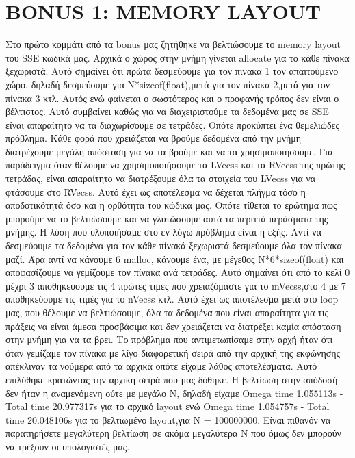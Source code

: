 \documentclass{FR16}
\begin{document}
\newpage

\section{BONUS 1: MEMORY LAYOUT}
Στο πρώτο κομμάτι από τα bonus μας ζητήθηκε να βελτιώσουμε το memory layout του SSE κωδικά μας. Αρχικά ο χώρος στην μνήμη γίνεται allocate για το κάθε πίνακα ξεχωριστά. Αυτό σημαίνει ότι πρώτα δεσμεύουμε για τον πίνακα 1 τον απαιτούμενο χώρο, δηλαδή δεσμεύουμε για N*sizeof(float),μετά για τον πίνακα 2,μετά για τον πίνακα 3 κτλ. Αυτός ενώ φαίνεται ο σωστότερος και ο προφανής τρόπος δεν είναι ο βέλτιστος. Αυτό συμβαίνει καθώς για να διαχειριστούμε τα δεδομένα μας σε SSE είναι απαραίτητο να τα διαχωρίσουμε σε τετράδες. Οπότε προκύπτει ένα θεμελιώδες πρόβλημα. Κάθε φορά που χρειάζεται να βρούμε δεδομένα από την μνήμη διατρέχουμε μεγάλη απόσταση για να τα βρούμε και να τα χρησιμοποιήσουμε. Για παράδειγμα όταν θέλουμε να χρησιμοποιήσουμε τα LVecss και τα RVecss της πρώτης τετράδας, είναι απαραίτητο να διατρέξουμε όλα τα στοιχεία του LVecss για να φτάσουμε στο RVecss. Αυτό έχει ως αποτέλεσμα να δέχεται πλήγμα τόσο η αποδοτικότητά όσο και η ορθότητα του κώδικα μας. \newline Οπότε τίθεται το ερώτημα πως μπορούμε να το βελτιώσουμε και να γλυτώσουμε αυτά τα περιττά περάσματα της μνήμης. Η λύση που υλοποιήσαμε στο εν λόγω πρόβλημα είναι η εξής. Αντί να δεσμεύουμε τα δεδομένα για τον κάθε πίνακά ξεχωριστά δεσμεύουμε όλα τον πίνακα μαζί. Άρα αντί να κάνουμε 6 malloc, κάνουμε ένα, με μέγεθος N*6*sizeof(float) και αποφασίζουμε να γεμίζουμε τον πίνακα ανά τετράδες. Αυτό σημαίνει ότι από το κελί 0 μέχρι 3 αποθηκεύουμε τις 4 πρώτες τιμές που χρειαζόμαστε για το mVecss,στο 4 με 7 αποθηκεύουμε τις τιμές για το nVecss κτλ. Αυτό έχει ως αποτέλεσμα μετά στο loop μας, που θέλουμε να βελτιώσουμε, όλα τα δεδομένα που είναι απαραίτητα για τις πράξεις να είναι άμεσα προσβάσιμα και δεν χρειάζεται να διατρέξει καμία απόσταση στην μνήμη για να τα βρει. \newline Το πρόβλημα που αντιμετωπίσαμε στην αρχή ήταν ότι όταν γεμίζαμε τον πίνακα με λίγο διαφορετική σειρά από την αρχική της εκφώνησης απέκλιναν τα νούμερα από τα αρχικά οπότε είχαμε λάθος αποτελέσματα. Αυτό επιλύθηκε κρατώντας την αρχική σειρά που μας δόθηκε. Η βελτίωση στην απόδοσή δεν ήταν η αναμενόμενη ούτε με μεγάλο Ν, δηλαδή είχαμε Omega time 1.055113s - Total time 20.977317s για το αρχικό layout ενώ  Omega time 1.054757s - Total time 20.048106s για το βελτιωμένο layout,για  N = 100000000. Είναι πιθανόν να παρατηρήσετε μεγαλύτερη βελτίωση σε ακόμα μεγαλύτερα Ν που όμως δεν μπορούν να τρέξουν οι υπολογιστές μας.\newline
\end{document}
